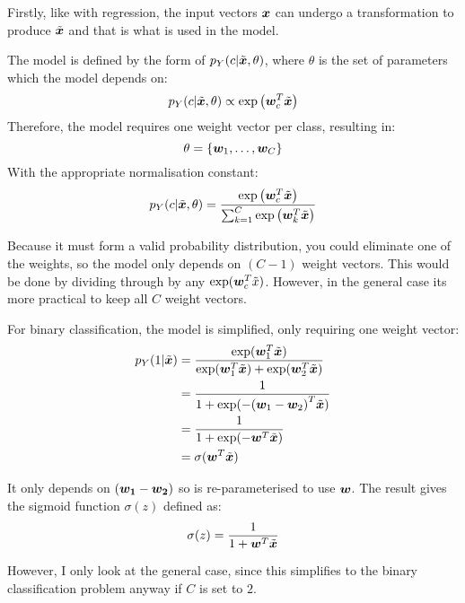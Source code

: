 \documentclass[../../main.tex]{subfiles}
\begin{document}
Firstly, like with regression, the input vectors $\bm{x}$ can undergo a transformation to produce $\tilde{\bm{x}}$ and that is what is used in the model.

The model is defined by the form of $p_Y(c|\tilde{\bm{x}}, \theta)$, where $\theta$ is the set of parameters which the model depends on:
\[ p_Y(c|\tilde{\bm{x}}, \theta) \propto \exp{\left( \bm{w} _c^T\tilde{ \bm{x} } \right)} \]
Therefore, the model requires one weight vector per class, resulting in:
\[ \theta = \left\{\bm{w}_1, \ldots, \bm{w}_C \right\} \]
With the appropriate normalisation constant:
\[ p_Y(c|\tilde{\bm{x}}, \theta) = \frac{\exp{\left( \bm{w} _c^T\tilde{ \bm{x} } \right)}}{\sum_{k=1}^C \exp{\left( \bm{w} _k^T\tilde{ \bm{x} } \right)}} \]

Because it must form a valid probability distribution, you could eliminate one of the weights, so the model only depends on $(C - 1)$ weight vectors.
This would be done by dividing through by any $\exp(\bm{w}_c^T\tilde{x})$.
However, in the general case its more practical to keep all $C$ weight vectors.

For binary classification, the model is simplified, only requiring one weight vector:
\begin{align*}
p_Y(1|\tilde{\bm{x}})
&= \frac
    {\exp(\bm{w}_1^T\tilde{\bm{x}})}
    {\exp(\bm{w}_1^T\tilde{\bm{x}}) + \exp(\bm{w}_2^T\tilde{\bm{x}})} \\
&= \frac{1}
{1 + \exp(-{(\bm{w}_1 - \bm{w}_2)}^T\tilde{\bm{x}})} \\
&= \frac{1}{1 + \exp(-\bm{w}^T\tilde{\bm{x}})} \\
&= \sigma(\bm{w}^T\tilde{\bm{x}})
\end{align*}

It only depends on $(\bm{w_1} - \bm{w_2})$ so is re-parameterised to use $\bm{w}$.
The result gives the sigmoid function $\sigma(z)$ defined as:
\[ \sigma(z) = \frac{1}{1 + \bm{w}^T\tilde{\bm{x}}} \]

However, I only look at the general case, since this simplifies to the binary classification problem anyway if $C$ is set to $2$.
\end{document}
